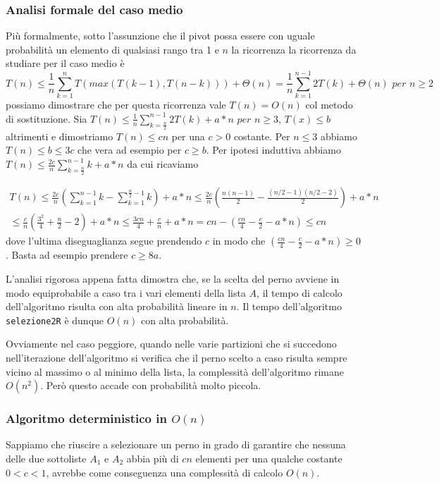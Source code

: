 \subsubsection{Analisi formale del caso medio}
Più formalmente, sotto l'assunzione che il pivot possa essere con uguale probabilità un elemento di qualsiasi rango tra 1 e $n$ la ricorrenza la ricorrenza da studiare per il caso medio è
\begin{equation*}
    T(n) \leq \frac{1}{n}\sum_{k=1}^n T(max(T(k-1), T(n-k))) + \Theta(n) = \frac{1}{n}\sum_{k=1}^{n-1}2T(k) + \Theta(n) \textit{ per } n\geq 2
\end{equation*}
possiamo dimostrare che per questa ricorrenza vale $T(n)=O(n)$ col metodo di sostituzione.
Sia $T(n)\leq \frac{1}{n}\sum_{k=\frac{n}{2}}^{n-1}2T(k)+a*n \textit{ per } n \geq 3$, $T(x) \leq b$ altrimenti e dimostriamo $T(n) \leq cn$ per una $c > 0$ costante.
Per $n \leq 3$ abbiamo $T(n) \leq b \leq 3c$ che vera ad esempio per $c \geq b$.
Per ipotesi induttiva abbiamo $T(n)\leq \frac{2c}{n}\sum_{k=\frac{n}{2}}^{n-1}k+a*n$ da cui ricaviamo

\begin{align*}
    T(n)\leq \frac{2c}{n}\left(\sum^{n-1}_{k=1}k-\sum^{\frac{n}{2}-1}_{k=1}k\right)+a*n\leq \frac{2c}{n}\left(\frac{n(n-1)}{2}-\frac{(n/2-1)(n/2-2)}{2}\right)+a*n\\\leq \frac{c}{n}\left(\frac{3^2}{4}+\frac{n}{2}-2\right)+a*n\leq \frac{3cn}{4}+\frac{c}{n}+a*n=cn-\left(\frac{cn}{4}-\frac{c}{2}-a*n\right)\leq cn
\end{align*}
dove l'ultima diseguaglianza segue prendendo $c$ in modo che $\left(\frac{cn}{4}-\frac{c}{2}-a*n\right)\geq0$. Basta ad esempio prendere $c\geq 8a$.

L'analisi rigorosa appena fatta dimostra che, se la scelta del perno avviene in modo equiprobabile a caso tra i vari elementi della lista $A$, il tempo di calcolo dell'algoritmo risulta con alta probabilità lineare in $n$. 
Il tempo dell'algoritmo \verb|selezione2R| è dunque $O(n)$ con alta probabilità.

Ovviamente nel caso peggiore, quando nelle varie partizioni che si succedono nell'iterazione dell'algoritmo si verifica che il perno scelto a caso risulta sempre vicino al massimo o al minimo della lista, la complessità dell'algoritmo rimane $O(n^2)$. Però questo accade con probabilità molto piccola.

\subsubsection{Algoritmo deterministico in $O(n)$}
Sappiamo che riuscire a selezionare un perno in grado di garantire che nessuna delle due sottoliste $A_1$ e $A_2$ abbia più di $cn$ elementi per una qualche costante $0<c<1$, avrebbe come conseguenza una complessità di calcolo $O(n)$.

